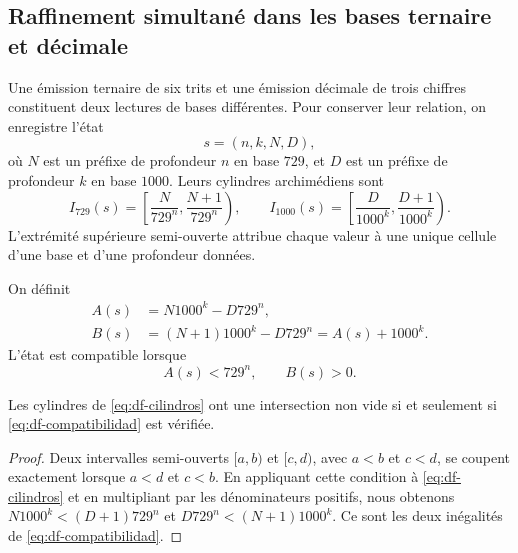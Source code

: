 \subsection{Raffinement simultané dans les bases ternaire et décimale}
\label{subsec:df-cilindros-mixtos}


Une émission ternaire de six trits et une émission décimale de trois chiffres
constituent deux lectures de bases différentes. Pour conserver leur relation, on
enregistre l'état
\[
 s=(n,k,N,D),
\]
où \(N\) est un préfixe de profondeur \(n\) en base \(729\), et \(D\) est
un préfixe de profondeur \(k\) en base \(1000\). Leurs cylindres
archimédiens sont
\begin{equation}
 I_{729}(s)=\left[\frac{N}{729^n},\frac{N+1}{729^n}\right),\qquad
 I_{1000}(s)=\left[\frac{D}{1000^k},\frac{D+1}{1000^k}\right).
 \label{eq:df-cilindros}
\end{equation}
L'extrémité supérieure semi-ouverte attribue chaque valeur à une unique cellule d'une base et d'une profondeur données.

\begin{definition}
On définit
\begin{align}
 A(s)&=N1000^k-D729^n,\label{eq:df-defecto-inferior}\\
 B(s)&=(N+1)1000^k-D729^n=A(s)+1000^k.
 \label{eq:df-defecto-superior}
\end{align}
L'état est compatible lorsque
\begin{equation}
 A(s)<729^n,\qquad B(s)>0.
 \label{eq:df-compatibilidad}
\end{equation}
\end{definition}

\begin{lemma}
Les cylindres de \eqref{eq:df-cilindros} ont une intersection non vide si et
seulement si \eqref{eq:df-compatibilidad} est vérifiée.
\end{lemma}

\begin{proof}
Deux intervalles semi-ouverts \([a,b)\) et \([c,d)\), avec \(a<b\) et
\(c<d\), se coupent exactement lorsque \(a<d\) et \(c<b\). En appliquant cette
condition à \eqref{eq:df-cilindros} et en multipliant par les dénominateurs
positifs, nous obtenons
\(N1000^k<(D+1)729^n\) et
\(D729^n<(N+1)1000^k\). Ce sont les deux inégalités de
\eqref{eq:df-compatibilidad}.
\end{proof}

